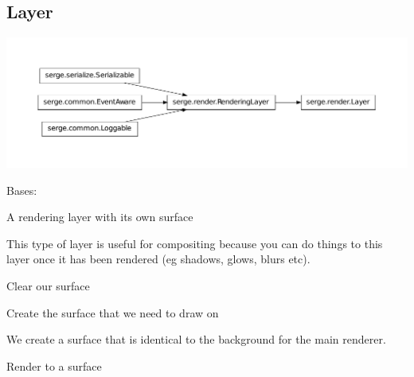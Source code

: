 \documentclass[letterpaper,10pt,english]{sphinxmanual}
\begin{document}
\subsection{Layer}
\label{renderering:layer}
\includegraphics{inheritance-5a62e94f593424d7cc2bac90bb2cd84a200ced64.pdf}

\begin{fulllineitems}
\label{renderering:serge.render.Layer}
Bases: {\hyperref[renderering:serge.render.RenderingLayer]{}}

A rendering layer with its own surface

This type of layer is useful for compositing because
you can do things to this layer once it has been
rendered (eg shadows, glows, blurs etc).

\begin{fulllineitems}
\label{renderering:serge.render.Layer.clearSurface}
Clear our surface

\end{fulllineitems}


\begin{fulllineitems}
\label{renderering:serge.render.Layer.initSurface}
Create the surface that we need to draw on

We create a surface that is identical to the background for the
main renderer.

\end{fulllineitems}


\begin{fulllineitems}
\label{renderering:serge.render.Layer.render}
Render to a surface

\end{fulllineitems}


\end{fulllineitems}
\end{document}
